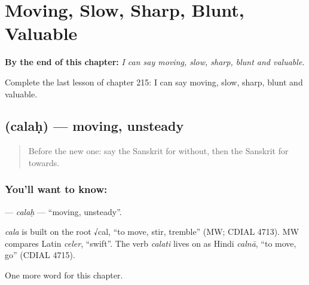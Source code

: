 
\chapter{Moving, Slow, Sharp, Blunt, Valuable}
\label{ch:sa-moving-slow-sharp-blunt-valuable}

\begin{chapteropening}
\textbf{By the end of this chapter:} \emph{I can say moving, slow, sharp, blunt and valuable.}

Complete the last lesson of chapter 215: I can say moving, slow, sharp, blunt and valuable.
\end{chapteropening}

\section[\texorpdfstring{\sk{चलः} (calaḥ)}{चलः (calaḥ)}]{ (calaḥ) — moving, unsteady}

\label{lesson:SA-C215-calah}



\begin{quote}
Before the new one: say the Sanskrit for without, then the Sanskrit for towards.
\end{quote}

\subsection*{You'll want to know: }
\textbf{} — \emph{calaḥ} — \textquotedblleft{}moving, unsteady\textquotedblright{}.

\begin{cousinweb}
\emph{cala} is built on the root √cal, \textquotedblleft{}to move, stir, tremble\textquotedblright{} (MW; CDIAL 4713). MW compares Latin \emph{celer}, \textquotedblleft{}swift\textquotedblright{}. The verb \emph{calati} lives on as Hindi \emph{calnā}, \textquotedblleft{}to move, go\textquotedblright{} (CDIAL 4715).
\end{cousinweb}

\begin{grammarlens}[title={What you've built}]
One more word for this chapter.
\end{grammarlens}

